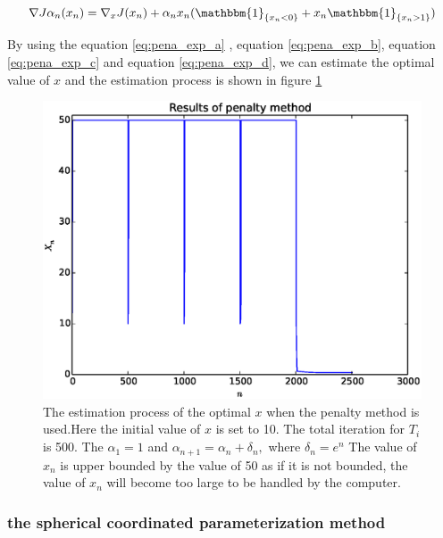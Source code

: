 \documentclass[a4paper,12pt]{article}
\begin{document}
\begin{equation}\label{eq:pena_exp_d}
\nabla J{\alpha_ n}(x_n) =\nabla _x J(x_n)+\alpha_n x_n( \mathbbm{1}_{\{x_n<0\}}+ x_n \mathbbm{1}_{\{x_n>1\}})
\end{equation}

By using the equation \ref{eq:pena_exp_a} , equation \ref{eq:pena_exp_b},  equation \ref{eq:pena_exp_c}  and equation \ref{eq:pena_exp_d}, we can estimate the optimal value of $x$ and the estimation process is shown in figure \ref{fig:poly_result}\\

\begin{figure}[H]
\begin{center}
\includegraphics[width=1.0\linewidth]{exp_est.eps}


\end{center}
   \caption{The estimation process of the optimal $x$ when the penalty method is used.Here the initial value of $x$ is set to 10. The total iteration for $T_i$ is 500. The $\alpha_1 = 1$ and $\alpha _{n+1} = \alpha _n + \delta_n,$ where $\delta _ n=e^n$ The value of $x_n$ is upper bounded by the value of 50 as if it is not bounded, the value of $x_n$ will become too large to be handled by the computer. }
\label{fig:poly_result}
\end{figure}


\subsubsection{the spherical coordinated parameterization method }
\end{document}
